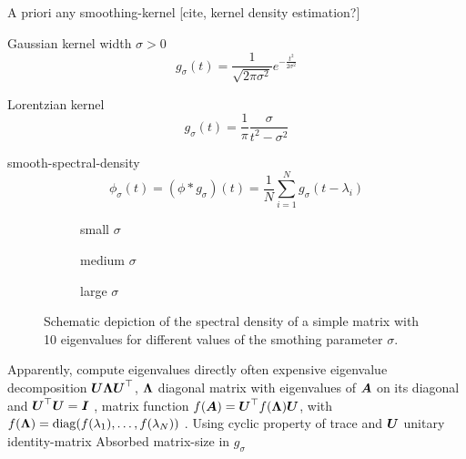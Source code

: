 A priori any \gls{smoothing-kernel} [cite, kernel density estimation?]

Gaussian kernel width $\sigma > 0$
\begin{equation}
    g_{\sigma}(t) = \frac{1}{\sqrt{2 \pi \sigma^2}} e^{-\frac{t^2}{2\sigma^2}}
    \label{equ:1-introduction-def-gaussian-kernel}
\end{equation}

Lorentzian kernel
\begin{equation}
    g_{\sigma}(t) = \frac{1}{\pi} \frac{\sigma}{t^2 - \sigma^2}
    \label{equ:1-introduction-def-lorentzian-kernel}
\end{equation}

\gls{smooth-spectral-density}
\begin{equation}
    \phi_{\sigma}(t) = (\phi \ast g_{\sigma})(t) = \frac{1}{N} \sum_{i=1}^{N} g_{\sigma}(t - \lambda_i)
    \label{equ:1-introduction-def-smooth-spectral-density}
\end{equation}

\begin{figure}[ht]
    \begin{subfigure}[b]{0.33\columnwidth}
        
        \caption{small $\sigma$}
        \label{fig:1-introduction-spectral-density-example-0.01}
    \end{subfigure}
    \begin{subfigure}[b]{0.33\columnwidth}
        
        \caption{medium $\sigma$}
        \label{fig:1-introduction-spectral-density-example-0.02}
    \end{subfigure}
    \begin{subfigure}[b]{0.33\columnwidth}
        
        \caption{large $\sigma$}
        \label{fig:1-introduction-spectral-density-example-0.05}
    \end{subfigure}
    \caption{Schematic depiction of the spectral density of a simple matrix with
    10 eigenvalues for different values of the smothing parameter $\sigma$.}
    \label{fig:1-introduction-smoothened-spectral-density}
\end{figure}

Apparently, compute eigenvalues directly often expensive
eigenvalue decomposition $\boldsymbol{U} \boldsymbol{\Lambda} \boldsymbol{U}^{\top}$,
$\boldsymbol{\Lambda}$ diagonal matrix with eigenvalues of $\boldsymbol{A}$ on its diagonal and $\boldsymbol{U}^{\top} \boldsymbol{U} = \boldsymbol{I}$ \cite[Theorem~4.1.5]{horn1985matrix},
matrix function $f(\boldsymbol{A}) = \boldsymbol{U}^{\top} f(\boldsymbol{\Lambda}) \boldsymbol{U}$,
with $f(\boldsymbol{\Lambda}) = \operatorname{diag}(f(\lambda_1), \dots, f(\lambda_N))$ \cite[Definition~1.2]{higham2008functions}.
Using cyclic property of trace and $\boldsymbol{U}$ unitary
\gls{identity-matrix}
Absorbed \gls{matrix-size} in $g_{\sigma}$

